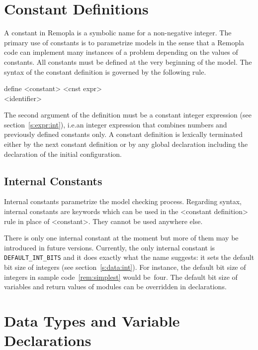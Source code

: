 \documentclass[a4paper,11pt,titlepage,english]{article}
\begin{document}
\section{Constant Definitions\label{s:constants}}

A constant in Remopla is a symbolic name for a non-negative integer. The
primary use of constants is to parametrize models in the sense that
a Remopla code can implement many instances of a problem depending on the
values of constants. All constants must be defined at the
very beginning of the model. The syntax of the constant definition is
governed by the following rule.

\begin{bnfgrammar}
 \is define <constant> <cnst expr> \\
[constant] \is <identifier> \\
\end{bnfgrammar}

The second argument of the definition must be a constant integer expression
(see section~\ref{s:expr:int}), i.e.\@ an integer expression that combines
numbers and previously defined constants only.  A constant definition is
lexically terminated either by the next constant definition or by any
global declaration including the declaration of the initial configuration.

\subsection{Internal Constants\label{s:constants:internal}}

Internal constants parametrize the model checking process.  Regarding
syntax, internal constants are keywords which can be used in the <constant
definition> rule in place of <constant>. They cannot be used anywhere else.

There is only one internal constant at the moment but more of them may
be introduced in future versions. Currently, the only internal constant
is \verb|DEFAULT_INT_BITS| and it does exactly what the name
suggests: it sets the default bit size of integers (see
section~\ref{s:data:int}). For instance, the default bit size of integers
in sample code~\ref{rem:simplest} would be~four.  The default bit size of
variables and return values of modules can be overridden in declarations.

\section{Data Types and Variable Declarations\label{s:data}}
\end{document}
